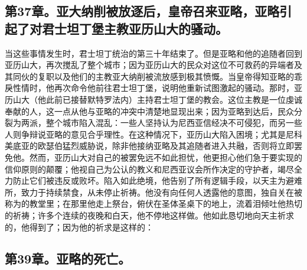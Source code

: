 
\subsection{第37章。亚大纳削被放逐后，皇帝召来亚略，亚略引起了对君士坦丁堡主教亚历山大的骚动。}

当这些事情发生时，君士坦丁统治的第三十年结束了。但是亚略和他的追随者回到亚历山大，再次搅乱了整个城市；因为亚历山大的民众对这位不可救药的异端者及其同伙的复职以及他们的主教亚大纳削被流放感到极其愤慨。当皇帝得知亚略的乖戾性情时，他再次命令他前往君士坦丁堡，说明他重新试图激起的骚动。那时，亚历山大（他此前已接替默特罗法内）主持君士坦丁堡的教会。这位主教是一位虔诚奉献的人，这一点从他与亚略的冲突中清楚地显现出来；因为亚略到达后，民众分裂为两派，整个城市陷入混乱：一些人坚持认为尼西亚信经决不可侵犯，而另一些人则争辩说亚略的意见合乎理性。在这种情况下，亚历山大陷入困境；尤其是尼科美底亚的欧瑟伯猛烈威胁说，除非他接纳亚略及其追随者进入共融，否则将立即罢免他。然而，亚历山大对自己的被罢免远不如此担忧，他更担心他们急于要实现的信仰原则的颠覆；他视自己为公认的教义和尼西亚议会所作决定的守护者，竭尽全力防止它们被违反或败坏。陷入如此绝境，他告别了所有逻辑手段，以天主为避难所，致力于持续禁食，从未停止祈祷。他没有向任何人透露他的意图，独自关在被称为的教堂里；在那里他走上祭台，俯伏在圣体圣桌下的地上，流着泪倾吐他热切的祈祷；许多个连续的夜晚和白天，他不停地这样做。他如此恳切地向天主祈求的，他得到了；因为他的祈求是这样的：\par


\subsection{第39章。亚略的死亡。}

